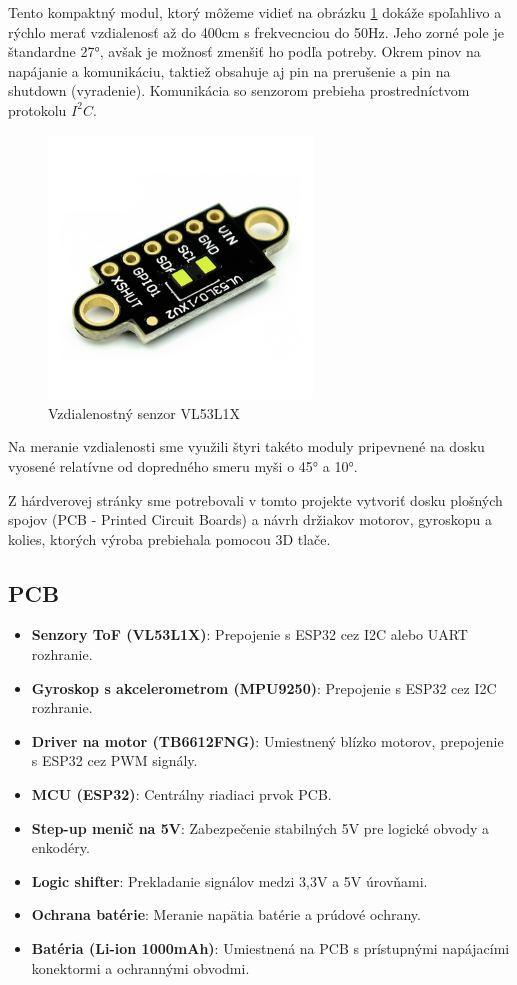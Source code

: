 Tento kompaktný modul, ktorý môžeme vidieť na obrázku  \ref{fig:vl53l1x} dokáže spoľahlivo a rýchlo merať vzdialenosť až do 400cm s frekvecnciou do 50Hz. Jeho zorné pole je štandardne 27°, avšak je možnosť zmenšiť ho podľa potreby. Okrem pinov na napájanie a komunikáciu, taktiež obsahuje aj pin na prerušenie a pin na shutdown (vyradenie). Komunikácia so senzorom prebieha prostredníctvom protokolu $I^2 C$.

\begin{figure}[!htpb]
    \centering
    \includegraphics[width=7cm]{includes/images/vl53l1x.jpg}
    \caption{Vzdialenostný senzor VL53L1X}
    \label{fig:vl53l1x}
\end{figure}

Na meranie vzdialenosti sme využili štyri takéto moduly pripevnené na dosku vyosené relatívne od dopredného smeru myši o 45° a 10°.

Z hárdverovej stránky sme potrebovali v tomto projekte vytvoriť dosku plošných spojov (PCB - Printed Circuit Boards) a návrh držiakov motorov, gyroskopu a kolies, ktorých výroba prebiehala pomocou 3D tlače.
\subsection{PCB}
\begin{itemize}
    \item \textbf{Senzory ToF (VL53L1X)}: Prepojenie s ESP32 cez I2C alebo UART rozhranie.
    \item \textbf{Gyroskop s akcelerometrom (MPU9250)}: Prepojenie s ESP32 cez I2C rozhranie.
    \item \textbf{Driver na motor (TB6612FNG)}: Umiestnený blízko motorov, prepojenie s ESP32 cez PWM signály.
    \item \textbf{MCU (ESP32)}: Centrálny riadiaci prvok PCB.
    \item \textbf{Step-up menič na 5V}: Zabezpečenie stabilných 5V pre logické obvody a enkodéry.
    \item \textbf{Logic shifter}: Prekladanie signálov medzi 3,3V a 5V úrovňami.
    \item \textbf{Ochrana batérie}: Meranie napätia batérie a prúdové ochrany.
    \item \textbf{Batéria (Li-ion 1000mAh)}: Umiestnená na PCB s prístupnými napájacími konektormi a ochrannými obvodmi.
\end{itemize}


